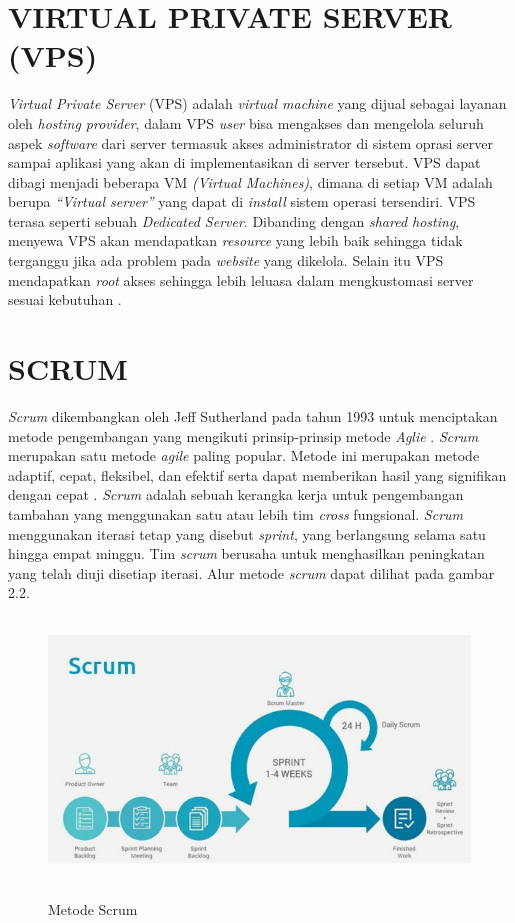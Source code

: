\section{\uppercase{Virtual Private Server (VPS)}}
\textit{Virtual Private Server} (VPS) adalah \textit{virtual machine} yang dijual sebagai layanan oleh \textit{hosting provider}, dalam VPS \textit{user} bisa mengakses dan mengelola seluruh aspek \textit{software} dari server termasuk akses administrator di sistem oprasi server sampai aplikasi yang akan di implementasikan di server tersebut. VPS dapat dibagi menjadi beberapa VM \textit{(Virtual Machines)}, dimana di setiap VM adalah berupa \textit{“Virtual server”} yang dapat di \textit{install} sistem operasi tersendiri. VPS terasa seperti sebuah \textit{Dedicated Server}. Dibanding dengan \textit{shared hosting}, menyewa VPS akan mendapatkan \textit{resource} yang lebih baik sehingga tidak terganggu jika ada problem pada \textit{website} yang dikelola. Selain itu VPS mendapatkan \textit{root} akses sehingga lebih leluasa dalam mengkustomasi server sesuai kebutuhan \citep{hamida2017analisis}.

\section{\uppercase{Scrum}}
\textit{Scrum} dikembangkan oleh Jeff Sutherland pada tahun 1993 untuk menciptakan metode pengembangan yang mengikuti prinsip-prinsip metode \textit{Aglie} \citep{fernando2018rancang}. \textit{Scrum} merupakan satu metode \textit{agile} paling popular. Metode ini merupakan metode adaptif, cepat, fleksibel, dan efektif serta dapat memberikan hasil yang signifikan dengan cepat \citep{hadinata2017implementasi}. \textit{Scrum} adalah sebuah kerangka kerja untuk pengembangan tambahan yang menggunakan satu atau lebih tim \textit{cross} fungsional. \textit{Scrum} menggunakan iterasi tetap yang disebut \textit{sprint}, yang berlangsung selama satu hingga empat minggu. Tim \textit{scrum} berusaha untuk menghasilkan peningkatan yang telah diuji disetiap iterasi. Alur metode \textit{scrum} dapat dilihat pada gambar 2.2.

\begin{figure}[H]
\centering
{\includegraphics [width = 12.5cm, height= 7cm]{gambar/scrum}}
\caption{Metode Scrum \citep{wahyudi2018analisis}}
\label{scrum}
\end{figure}	

